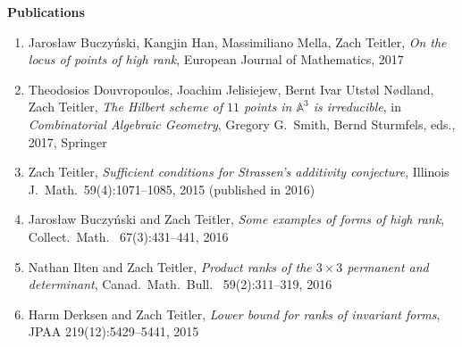 \documentclass[12pt]{article}
\begin{document}





\textbf{Publications}
\begin{enumerate}

\item Jaros{\l}aw Buczy\'nski, Kangjin Han, Massimiliano Mella, Zach Teitler,
\emph{On the locus of points of high rank},
European Journal of Mathematics, 2017

\item Theodosios Douvropoulos, Joachim Jelisiejew, Bernt Ivar Utst{\o}l N{\o}dland, Zach Teitler,
\emph{The Hilbert scheme of $11$ points in $\mathbb{A}^3$ is irreducible},
in \emph{Combinatorial Algebraic Geometry}, Gregory G.\ Smith, Bernd Sturmfels, eds., 2017, Springer

\item Zach Teitler,
\emph{Sufficient conditions for Strassen's additivity conjecture},
Illinois J.\ Math.\
59(4):1071--1085, 2015
(published in 2016)

\item Jaros{\l}aw Buczy\'nski and Zach Teitler,
\emph{Some examples of forms of high rank},
Collect.\ Math.\
67(3):431--441, 2016

\item Nathan Ilten and Zach Teitler,
\emph{Product ranks of the $3 \times 3$ permanent and determinant},
Canad.\ Math.\ Bull.\
59(2):311--319, 2016

\item Harm Derksen and Zach Teitler,
\emph{Lower bound for ranks of invariant forms},
JPAA
219(12):5429--5441, 2015


\end{enumerate}
\end{document}
